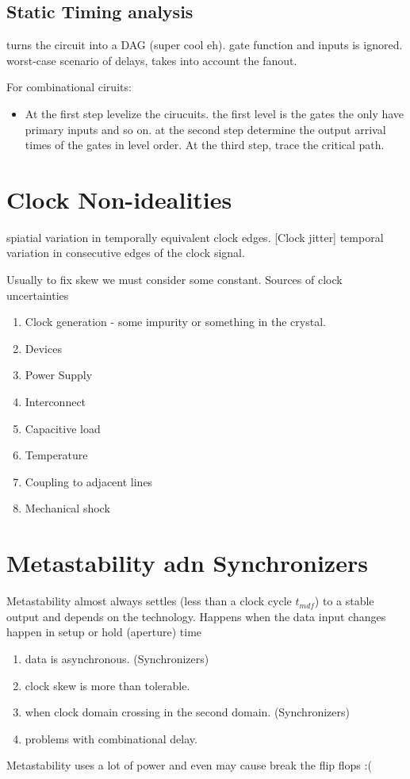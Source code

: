 \subsection{Static Timing analysis}
turns the circuit into a DAG (super cool eh). gate function and inputs is ignored. worst-case scenario of delays, takes into account the fanout.

For combinational ciruits:
\begin{itemize}
    \item At the first step levelize the cirucuits. the first level is the gates the only have primary inputs and so on. at the second step determine the output arrival times of the gates in level order. At the third step, trace the critical path.
\end{itemize}

\section{Clock Non-idealities}
\begin{definition}
     spiatial variation in temporally equivalent clock edges.
        [Clock jitter] temporal variation in consecutive edges of the clock signal.
\end{definition}
Usually to fix skew we must consider some constant. Sources of clock uncertainties
\begin{enumerate}
    \item Clock generation - some impurity or something in the crystal.
    \item Devices
    \item Power Supply
    \item Interconnect
    \item Capacitive load
    \item Temperature
    \item Coupling to adjacent lines
    \item Mechanical shock
\end{enumerate}
\section{Metastability adn Synchronizers}
Metastability almost always settles (less than a clock cycle \(t_{mdf}\)) to a stable output and depends on the technology. Happens when the data input changes happen in setup or hold (aperture) time
\begin{enumerate}
    \item data is asynchronous. (Synchronizers)
    \item clock skew is more than tolerable.
    \item when clock domain crossing in the second domain. (Synchronizers)
    \item problems with combinational delay.
\end{enumerate}
Metastability uses a lot of power and even may cause break the flip flops :(
